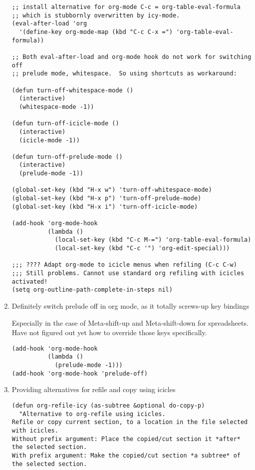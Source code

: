 \documentclass[nofonts]{tufte-handout}
\begin{document}
\begin{enumerate}
\begin{verbatim}
;; install alternative for org-mode C-c = org-table-eval-formula
;; which is stubbornly overwritten by icy-mode.
(eval-after-load 'org
  '(define-key org-mode-map (kbd "C-c C-x =") 'org-table-eval-formula))

;; Both eval-after-load and org-mode hook do not work for switching off
;; prelude mode, whitespace.  So using shortcuts as workaround:

(defun turn-off-whitespace-mode ()
  (interactive)
  (whitespace-mode -1))

(defun turn-off-icicle-mode ()
  (interactive)
  (icicle-mode -1))

(defun turn-off-prelude-mode ()
  (interactive)
  (prelude-mode -1))

(global-set-key (kbd "H-x w") 'turn-off-whitespace-mode)
(global-set-key (kbd "H-x p") 'turn-off-prelude-mode)
(global-set-key (kbd "H-x i") 'turn-off-icicle-mode)

(add-hook 'org-mode-hook
          (lambda ()
            (local-set-key (kbd "C-c M-=") 'org-table-eval-formula)
            (local-set-key (kbd "C-c '") 'org-edit-special)))

;;; ???? Adapt org-mode to icicle menus when refiling (C-c C-w)
;;; Still problems. Cannot use standard org refiling with icicles activated!
(setq org-outline-path-complete-in-steps nil)
\end{verbatim}

\item Definitely switch prelude off in org mode, as it totally screws-up key bindings
\label{sec-2-5-3-3}

Especially in the case of Meta-shift-up and Meta-shift-down for spreadsheets.
Have not figured out yet how to override those keys specifically.

\begin{verbatim}
(add-hook 'org-mode-hook
          (lambda ()
            (prelude-mode -1)))
(add-hook 'org-mode-hook 'prelude-off)
\end{verbatim}


\item Providing alternatives for refile and copy using icicles
\label{sec-2-5-3-4}

\begin{verbatim}
(defun org-refile-icy (as-subtree &optional do-copy-p)
  "Alternative to org-refile using icicles.
Refile or copy current section, to a location in the file selected with icicles.
Without prefix argument: Place the copied/cut section it *after* the selected section.
With prefix argument: Make the copied/cut section *a subtree* of the selected section.


\end{verbatim}
\end{enumerate}
\end{document}
